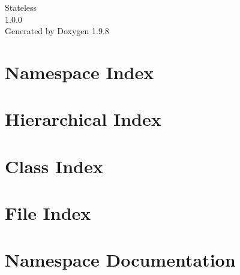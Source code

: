 \documentclass[twoside]{book}
\newcommand{\+}{\discretionary{\mbox{\scriptsize$\hookleftarrow$}}{}{}}
\newcommand{\clearemptydoublepage}{%
    \newpage{\pagestyle{empty}\cleardoublepage}%
  }
\begin{document}
  \raggedbottom
    \hypersetup{pageanchor=false,
                bookmarksnumbered=true,
                pdfencoding=unicode
               }
  \begin{titlepage}
  \vspace*{7cm}
  \begin{center}%
  {\Large Stateless}\\
  [1ex]\large 1.\+0.\+0 \\
  \vspace*{1cm}
  {\large Generated by Doxygen 1.9.8}\\
  \end{center}
  \end{titlepage}
  \clearemptydoublepage
  \tableofcontents
  \clearemptydoublepage
  \hypersetup{pageanchor=true}
\chapter{Namespace Index}

\chapter{Hierarchical Index}

\chapter{Class Index}

\chapter{File Index}

\chapter{Namespace Documentation}













\end{document}

